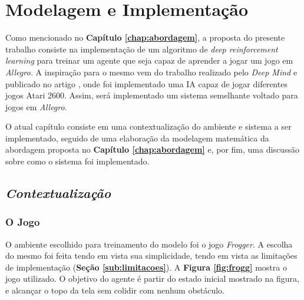\chapter{Modelagem e Implementação}
\label{chap:model}

Como mencionado no \textbf{Capítulo \ref{chap:abordagem}}, a proposta do presente trabalho consiste na implementação de um algoritmo de \textit{deep reinforcement learning} para treinar um agente que seja capaz de aprender a jogar um jogo em \textit{Allegro.} A inspiração para o mesmo vem do trabalho realizado pelo \textit{Deep Mind} e publicado no artigo \cite{play-atari-drl-deepmind}, onde foi implementado uma IA capaz de jogar diferentes jogos Atari 2600. Assim, será implementado um sistema semelhante voltado para jogos em \textit{Allegro}.

O atual capítulo consiste em uma contextualização do ambiente e sistema a ser implementado, seguido de uma elaboração da modelagem matemática da abordagem proposta no \textbf{Capítulo \ref{chap:abordagem}} e, por fim, uma discussão sobre como o sistema foi implementado.

\section{\textit{Contextualização}} %
\label{sec:contextualizacao}


\subsection{O Jogo} %
\label{sub:o_jogo}

O ambiente escolhido para treinamento do modelo foi o jogo \textit{Frogger}. A escolha do mesmo foi feita tendo em vista sua simplicidade, tendo em vista as limitações de implementação (\textbf{Seção \ref{sub:limitacoes}}). A \textbf{Figura \ref{fig:frogg}} mostra o jogo utilizado. O objetivo do agente é partir do estado inicial mostrado na figura, e alcançar o topo da tela sem colidir com nenhum obstáculo.

